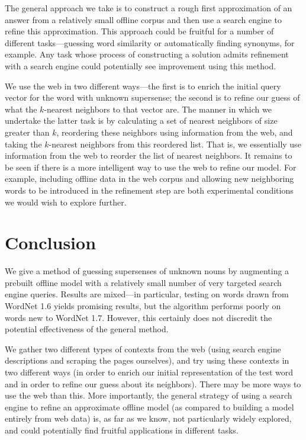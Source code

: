 \documentclass{article}
\begin{document}
The general approach we take is to construct a rough first approximation of an answer from a relatively small offline corpus and then use a search engine to refine this approximation.
This approach could be fruitful for a number of different tasks---guessing word similarity or automatically finding synonyms, for example.
Any task whose process of constructing a solution admits refinement with a search engine  could potentially see improvement using this method.

We use the web in two different ways---the first is to enrich the initial query vector for the word with unknown supersense; the second is to refine our guess of what the $k$-nearest neighbors to that vector are.
The manner in which we undertake the latter task is by calculating a set of nearest neighbors of size greater than $k$, reordering these neighbors using information from the web, and taking the $k$-nearest neighbors from this reordered list.
That is, we essentially use information from the web to reorder the list of nearest neighbors.
It remains to be seen if there is a more intelligent way to use the web to  refine our model.
For example, including offline data in the web corpus and allowing new neighboring words to be introduced in the refinement step are both experimental conditions we would wish to explore further.

\section{Conclusion}


We give a method of guessing supersenses of unknown nouns by augmenting a prebuilt offline model with a relatively small number of very targeted search engine queries.
Results are mixed---in particular, testing on words drawn from WordNet 1.6 yields promising results, but the algorithm performs poorly on words new to WordNet 1.7.
However, this certainly does not discredit the potential effectiveness of the general method.

We gather two different types of contexts from the web (using search engine descriptions and scraping the pages ourselves), and try using these contexts in two different ways (in order to enrich our initial representation of the test word and in order to refine our guess about its neighbors).
There may be more ways to use the web than this.
More importantly, the general strategy of using a search engine to refine an approximate offline model (as compared to building a model entirely from web data) is, as far as we know, not particularly widely explored, and could potentially find fruitful applications in different tasks.



{}

\end{document}
